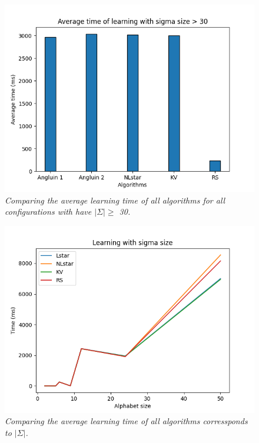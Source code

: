 \begin{figure}[h]
    \centering
    \includegraphics[scale=0.75]{figures/average_time3.png}
    \caption{\textit{Comparing the average learning time of all algorithms for all configurations with have $|\Sigma| \geq$  30.}}
    \label{fig:average_time3}
\end{figure}

\begin{figure}[h]
    \centering
    \includegraphics[scale=0.75]{figures/sigma_size.png}
    \caption{\textit{Comparing the average learning time of all algorithms corressponds to $|\Sigma|$.}}
    \label{fig:sigma_size}
\end{figure}

